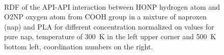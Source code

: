 \newpage
\begin{figure}[H]
	\centering
	\\
	\vspace{-0.3cm}
	\caption{RDF of the API-API interaction between HONP hydrogen atom and O2NP oxygen atom from COOH group in a mixture of naproxen (nap) and PLA for different concentration normalized on values for pure nap, temperature of 300~K in the left upper corner and 500~K bottom left, coordination numbers on the right.}
	\label{fig:nap_RDF_}
\end{figure}

